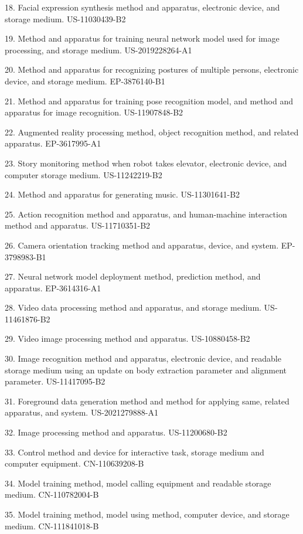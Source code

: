 \documentclass[10pt]{article}
\makeatletter
\newlength{\bibhang}
\newlength{\bibsep}
 {\@listi \global\bibsep\itemsep \global\advance\bibsep by\parsep}
\newenvironment{bibsection}%
        {\vspace{\itemsep}\begin{list}{}{%
       \setlength{\leftmargin}{\bibhang}%
       \setlength{\itemsep}{\bibsep}%
       \setlength{\parsep}{\z@}%
        \setlength{\partopsep}{0pt}%
        \setlength{\topsep}{0pt}}}
        {\end{list}\vspace{\itemsep}}
\makeatother
\begin{document}
\begin{bibsection}
  \item[18.] Facial expression synthesis method and apparatus, electronic device, and storage medium. US-11030439-B2
  \item[19.] Method and apparatus for training neural network model used for image processing, and storage medium. US-2019228264-A1
  \item[20.] Method and apparatus for recognizing postures of multiple persons, electronic device, and storage medium. EP-3876140-B1
  \item[21.] Method and apparatus for training pose recognition model, and method and apparatus for image recognition. US-11907848-B2
  \item[22.] Augmented reality processing method, object recognition method, and related apparatus. EP-3617995-A1
  \item[23.] Story monitoring method when robot takes elevator, electronic device, and computer storage medium. US-11242219-B2
  \item[24.] Method and apparatus for generating music. US-11301641-B2
  \item[25.] Action recognition method and apparatus, and human-machine interaction method and apparatus. US-11710351-B2
  \item[26.] Camera orientation tracking method and apparatus, device, and system. EP-3798983-B1
  \item[27.] Neural network model deployment method, prediction method, and apparatus. EP-3614316-A1
  \item[28.] Video data processing method and apparatus, and storage medium. US-11461876-B2
  \item[29.] Video image processing method and apparatus. US-10880458-B2
  \item[30.] Image recognition method and apparatus, electronic device, and readable storage medium using an update on body extraction parameter and alignment parameter. US-11417095-B2
  \item[31.] Foreground data generation method and method for applying same, related apparatus, and system. US-2021279888-A1
  \item[32.] Image processing method and apparatus. US-11200680-B2
  \item[33.] Control method and device for interactive task, storage medium and computer equipment. CN-110639208-B
  \item[34.] Model training method, model calling equipment and readable storage medium. CN-110782004-B
  \item[35.] Model training method, model using method, computer device, and storage medium. CN-111841018-B

\end{bibsection}
\end{document}
